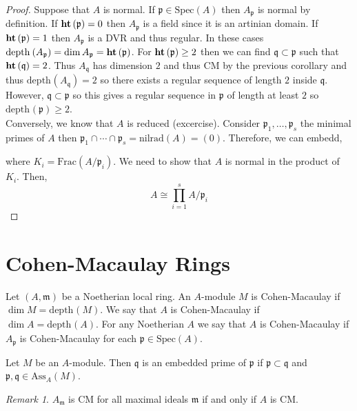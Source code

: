 \documentclass[12pt]{article}
\newcommand{\Frac}[1]{\mathrm{Frac}\left(#1\right)}
\newcommand{\Ass}[2]{\mathrm{Ass}_{#1}\left( #2 \right)}
\newcommand{\Spec}[1]{\mathrm{Spec}\left( #1 \right)}
\newcommand{\nilrad}[1]{\mathrm{nilrad}\left( #1 \right)}
\newcommand{\depth}[2]{\mathrm{depth}_{#1}\left(#2\right)}
\newcommand{\p}{\mathfrak{p}}
\newcommand{\q}{\mathfrak{q}}
\newcommand{\m}{\mathfrak{m}}
\theoremstyle{remark}
\newtheorem*{remark}{Remark}
\theoremstyle{definition}
\newenvironment{definition}[1][Definition:]{\begin{trivlist}
\item[\hskip \labelsep {\bfseries #1}]}{\end{trivlist}}
\begin{document}
\begin{proof}
Suppose that $A$ is normal. If $\p \in \Spec{A}$ then $A_{\p}$ is normal by definition. If $\height{\p} = 0$ then $A_{\p}$ is a field since it is an artinian domain. If $\height{\p} = 1$ then $A_{\p}$ is a DVR and thus regular. In these cases $\depth{}{A_\p} = \dim{A_\p} = \height{\p}$. For $\height{\p} \ge 2$ then we can find $\q \subset \p$ such that $\height{\q} = 2$. Thus $A_{\q}$ has dimension $2$ and thus CM by the previous corollary and thus $\depth{}{A_{\q}} = 2$ so there exists a regular sequence of length $2$ inside $\q$. However, $\q \subset \p$ so this gives a regular sequence in $\p$ of length at least $2$ so $\depth{}{\p} \ge 2$.  
\\
Conversely, we know that $A$ is reduced (excercise). Consider $\p_1, \dots, \p_s$ the minimal primes of $A$ then $\p_1 \cap \cdots \cap \p_s = \nilrad{A} = (0)$. Therefore, we can embedd,
\begin{center}
\end{center}  
where $K_i = \Frac{A / \p_i}$. We need to show that $A$ is normal in the product of $K_i$. Then,
\[ A \cong \prod_{i = 1}^s A / \p_i \]
\end{proof}



\section{Cohen-Macaulay Rings}

\begin{definition}
Let $(A, \m)$ be a Noetherian local ring. An $A$-module $M$ is Cohen-Macaulay if $\dim{M} = \depth{}{M}$. We say that $A$ is Cohen-Macaulay if $\dim{A} = \depth{}{A}$. For any Noetherian $A$ we say that $A$ is Cohen-Macaulay if $A_{\p}$ is Cohen-Macaulay for each $\p \in \Spec{A}$. 
\end{definition}

\begin{definition}
Let $M$ be an $A$-module. Then $\q$ is an embedded prime of $\p$ if $\p \subset \q$ and $\p, \q \in \Ass{A}{M}$. 
\end{definition}

\begin{remark}
$A_{\m}$ is CM for all maximal ideals $\m$ if and only if $A$ is CM.
\end{remark}
\end{document}
